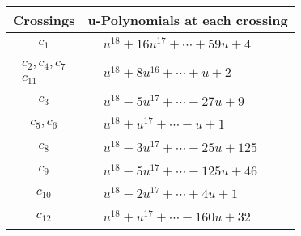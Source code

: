 \documentclass[1p]{elsarticle_modified}
\theoremstyle{definition}
\begin{document}
\begin{tabular}{m{50pt}|m{274pt}}
Crossings & \hspace{64pt}u-Polynomials at each crossing \\
\hline $$\begin{aligned}c_{1}\end{aligned}$$&$\begin{aligned}
&u^{18}+16 u^{17}+\cdots+59 u+4
\end{aligned}$\\
\hline $$\begin{aligned}c_{2},c_{4},c_{7}\\c_{11}\end{aligned}$$&$\begin{aligned}
&u^{18}+8 u^{16}+\cdots+u+2
\end{aligned}$\\
\hline $$\begin{aligned}c_{3}\end{aligned}$$&$\begin{aligned}
&u^{18}-5 u^{17}+\cdots-27 u+9
\end{aligned}$\\
\hline $$\begin{aligned}c_{5},c_{6}\end{aligned}$$&$\begin{aligned}
&u^{18}+u^{17}+\cdots- u+1
\end{aligned}$\\
\hline $$\begin{aligned}c_{8}\end{aligned}$$&$\begin{aligned}
&u^{18}-3 u^{17}+\cdots-25 u+125
\end{aligned}$\\
\hline $$\begin{aligned}c_{9}\end{aligned}$$&$\begin{aligned}
&u^{18}-5 u^{17}+\cdots-125 u+46
\end{aligned}$\\
\hline $$\begin{aligned}c_{10}\end{aligned}$$&$\begin{aligned}
&u^{18}-2 u^{17}+\cdots+4 u+1
\end{aligned}$\\
\hline $$\begin{aligned}c_{12}\end{aligned}$$&$\begin{aligned}
&u^{18}+u^{17}+\cdots-160 u+32
\end{aligned}$\\
\hline
\end{tabular}\\~\\
\end{document}
